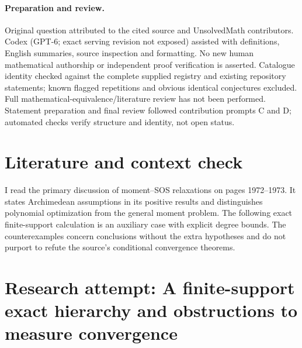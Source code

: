 \documentclass[11pt]{article}
\begin{document}
\paragraph{Preparation and review.}
Original question attributed to the cited source and UnsolvedMath contributors. Codex (GPT-6; exact serving revision not exposed) assisted with definitions, English summaries, source inspection and formatting. No new human mathematical authorship or independent proof verification is asserted. Catalogue identity checked against the complete supplied registry and existing repository statements; known flagged repetitions and obvious identical conjectures excluded. Full mathematical-equivalence/literature review has not been performed. Statement preparation and final review followed contribution prompts C and D; automated checks verify structure and identity, not open status.
\label{end:statement}

\section{Literature and context check}

I read the primary discussion of moment--SOS relaxations on pages 1972--1973.
It states Archimedean assumptions in its positive results and distinguishes
polynomial optimization from the general moment problem. The following exact
finite-support calculation is an auxiliary case with explicit degree bounds.
The counterexamples concern conclusions without the extra hypotheses and do
not purport to refute the source's conditional convergence theorems.

\section{Research attempt: A finite-support exact hierarchy and obstructions to measure convergence}
\end{document}
